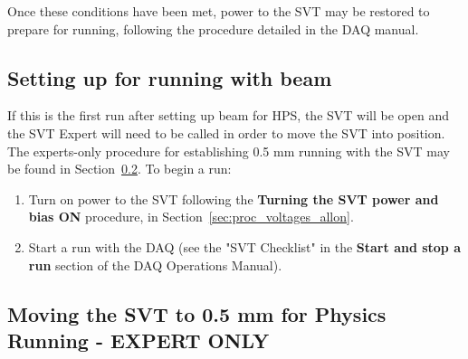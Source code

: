 \documentclass[12pt]{report}
\begin{document}
Once these conditions have been met, power to the SVT may be restored to prepare for running, following the procedure detailed in the DAQ manual.


\subsection{Setting up for running with beam}
\label{sec:proc_general_startrun}
If this is the first run after setting up beam for HPS, the SVT will be open and the SVT Expert will need to be called in order to move the SVT into position. The experts-only procedure for establishing 0.5 mm running with the SVT may be found in Section~\ref{sec:proc_svt_0.5mm}.  To begin a run:
\begin{enumerate}
\item Turn on power to the SVT following the \textbf{Turning the SVT power and bias ON} procedure, in Section~\ref{sec:proc_voltages_allon}.
\item Start a run with the DAQ (see the "SVT Checklist" in the \textbf{Start and stop a run} section of the DAQ Operations Manual).
\end{enumerate}

\subsection{Moving the SVT to 0.5 mm for Physics Running - \textbf{EXPERT ONLY}}
\label{sec:proc_svt_0.5mm}
\end{document}

